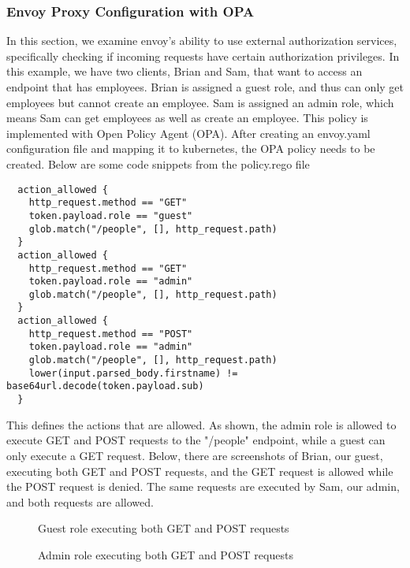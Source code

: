 \subsubsection{Envoy Proxy Configuration with OPA}
In this section, we examine envoy's ability to use external authorization services, specifically checking
if incoming requests have certain authorization privileges. In this example, we have two clients, Brian and Sam, that
want to access an endpoint that has employees. Brian is assigned a guest role, and thus can only get employees but cannot
create an employee. Sam is assigned an admin role, which means Sam can get employees as well as create an employee. This policy
is implemented with Open Policy Agent (OPA). After creating an envoy.yaml configuration file and mapping it to kubernetes,
the OPA policy needs to be created. Below are some code snippets from the policy.rego file
\begin{verbatim}
  action_allowed {
    http_request.method == "GET"
    token.payload.role == "guest"
    glob.match("/people", [], http_request.path)
  }
  action_allowed {
    http_request.method == "GET"
    token.payload.role == "admin"
    glob.match("/people", [], http_request.path)
  }
  action_allowed {
    http_request.method == "POST"
    token.payload.role == "admin"
    glob.match("/people", [], http_request.path)
    lower(input.parsed_body.firstname) != base64url.decode(token.payload.sub)
  }
\end{verbatim}
This defines the actions that are allowed. As shown, the admin role is allowed to execute GET and POST requests to the "/people" endpoint, while
a guest can only execute a GET request. Below, there are screenshots of Brian, our guest, executing both GET and POST requests, and the GET request
is allowed while the POST request is denied. The same requests are executed by Sam, our admin, and both requests are allowed.

\begin{figure}[t]
  \begin{center}
    \vspace{-0.2in}
    \caption{Guest role executing both GET and POST requests}
    \label{fig:opa-guest}
  \end{center}
\end{figure}

\begin{figure}[t]
  \begin{center}
    \vspace{-0.2in}
    \caption{Admin role executing both GET and POST requests}
    \label{fig:opa-admin}
  \end{center}
\end{figure}

